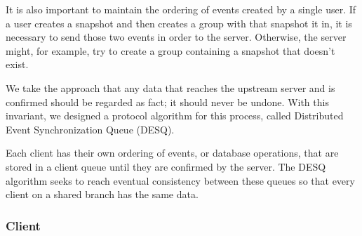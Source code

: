 It is also important to maintain the ordering of events created by a single user. If a user creates a snapshot and then creates a group with that snapshot it in, it is necessary to send those two events in order to the server. Otherwise, the server might, for example, try to create a group containing a snapshot that doesn't exist.

We take the approach that any data that reaches the upstream server and is confirmed should be regarded as fact; it should never be undone. With this invariant, we designed a protocol algorithm for this process, called Distributed Event Synchronization Queue (DESQ).

Each client has their own ordering of events, or database operations, that are stored in a client queue until they are confirmed by the server. The DESQ algorithm seeks to reach eventual consistency between these queues so that every client on a shared branch has the same data.

\subsubsection{Client}

